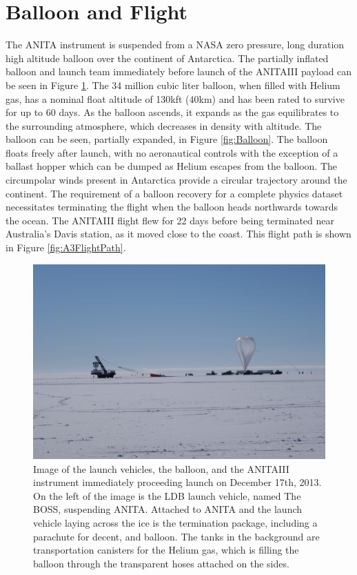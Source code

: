 \section{Balloon and Flight}
		The ANITA instrument is suspended from a NASA zero pressure, long duration high altitude balloon over the continent of Antarctica.  The partially inflated balloon and launch team immediately before launch of the ANITAIII payload can be seen in Figure \ref{fig:Launch}.  The 34 million cubic liter balloon, when filled with Helium gas, has a nominal float altitude of 130kft (40km) and has been rated to survive for up to 60 days.  As the balloon ascends, it expands as the gas equilibrates to the surrounding atmosphere, which decreases in density with altitude. The balloon can be seen, partially expanded, in Figure \ref{fig:Balloon}.  The balloon floats freely after launch, with no aeronautical controls with the exception of a ballast hopper which can be dumped as Helium escapes from the balloon. The circumpolar winds present in Antarctica provide a circular trajectory around the continent.  The requirement of a balloon recovery for a complete physics dataset necessitates terminating the flight when the balloon heads northwards towards the ocean.  The ANITAIII flight flew for 22 days before being terminated near Australia's Davis station, as it moved close to the coast.  This flight path is shown in Figure \ref{fig:A3FlightPath}.

\begin{figure}
\centering
	\includegraphics[width=\textwidth]{figures/Launch}
	\caption{Image of the launch vehicles, the balloon, and the ANITAIII instrument immediately proceeding launch on December 17th, 2013.  On the left of the image is the LDB launch vehicle, named The BOSS, suspending ANITA.  Attached to ANITA and the launch vehicle laying across the ice is the termination package, including a parachute for decent, and balloon.  The tanks in the background are transportation canisters for the Helium gas, which is filling the balloon through the transparent hoses attached on the sides.}
	\label{fig:Launch}
\end{figure}
			
